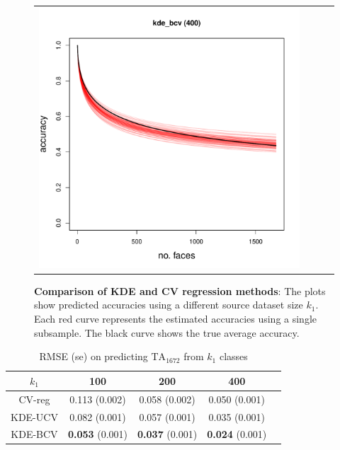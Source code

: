 \documentclass[twoside,11pt]{article}
\begin{document}
\begin{figure}
\begin{tabular}{cccc}
\includegraphics[scale = 0.2, clip = true, trim = 0 0 0 0.6in, valign=c]{repeat_400_kde_bcv.pdf} \\
\end{tabular}
\caption{\textbf{Comparison of KDE and CV regression methods}: The
  plots show predicted accuracies using a different source dataset
  size $k_1$. Each red curve represents the estimated accuracies using
  a single subsample. The black curve shows the true average
  accuracy. }
\label{fig:lfw_extrapolation2}
\end{figure}

\begin{table}
\centering
\begin{tabular}{c||c|c|c|c}
\hline
$k_1$ & 100 & 200 & 400 \\\hline
CV-reg & 0.113 (0.002) & 0.058 (0.002) & 0.050 (0.001)\\\hline
KDE-UCV & 0.082 (0.001) & 0.057 (0.001) & 0.035 (0.001) \\ \hline
KDE-BCV & \textbf{0.053} (0.001) & \textbf{0.037} (0.001) & \textbf{0.024} (0.001)\\\hline
\end{tabular}
\caption{RMSE (se) on predicting $\text{TA}_{1672}$ from $k_1$ classes}\label{tab:lfw_accuracy}
\end{table}
\end{document}
